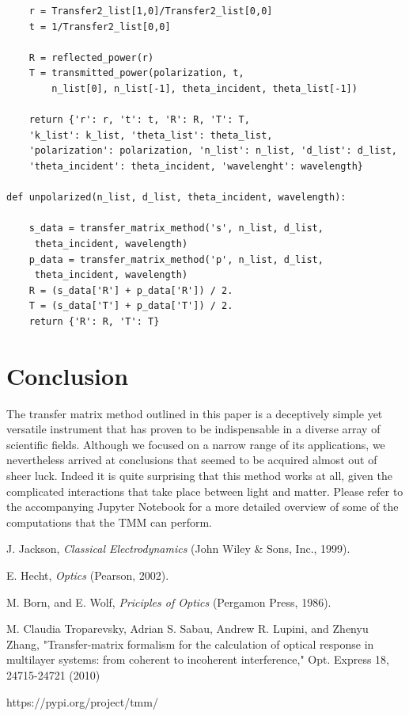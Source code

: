 \documentclass[preprint, onecolumn, amsmath, amssymb, aps]{revtex4-1}
\numberwithin{equation}{section}
\begin{document}
\begin{lstlisting}
	r = Transfer2_list[1,0]/Transfer2_list[0,0]
	t = 1/Transfer2_list[0,0]

	R = reflected_power(r)
	T = transmitted_power(polarization, t,
		n_list[0], n_list[-1], theta_incident, theta_list[-1])

	return {'r': r, 't': t, 'R': R, 'T': T,
	'k_list': k_list, 'theta_list': theta_list,
	'polarization': polarization, 'n_list': n_list, 'd_list': d_list, 
	'theta_incident': theta_incident, 'wavelenght': wavelength}

def unpolarized(n_list, d_list, theta_incident, wavelength):

	s_data = transfer_matrix_method('s', n_list, d_list,
	 theta_incident, wavelength)
	p_data = transfer_matrix_method('p', n_list, d_list,
	 theta_incident, wavelength)
	R = (s_data['R'] + p_data['R']) / 2.
	T = (s_data['T'] + p_data['T']) / 2.
	return {'R': R, 'T': T}
\end{lstlisting}

\section{Conclusion}

The transfer matrix method outlined in this paper is a deceptively simple yet versatile instrument that has proven to be indispensable in a diverse array of scientific fields. Although we focused on a narrow range of its applications, we nevertheless arrived at conclusions that seemed to be acquired almost out of sheer luck. Indeed it is quite surprising that this method works at all, given the complicated interactions that take place between light and matter. Please refer to the accompanying Jupyter Notebook for a more detailed overview of some of the computations that the TMM can perform.  


\begin{thebibliography}{1}
	
 J. Jackson, \textit{Classical Electrodynamics} (John Wiley \& Sons, Inc., 1999).
	
 E. Hecht, \textit{Optics} (Pearson, 2002).
	
 M. Born, and E. Wolf, \textit{Priciples of Optics} (Pergamon Press, 1986).
	
 M. Claudia Troparevsky, Adrian S. Sabau, Andrew R. Lupini, and Zhenyu Zhang, "Transfer-matrix formalism for the calculation of optical response in multilayer systems: from coherent to incoherent interference," Opt. Express 18, 24715-24721 (2010)

 https://pypi.org/project/tmm/

\end{thebibliography}
\end{document}

